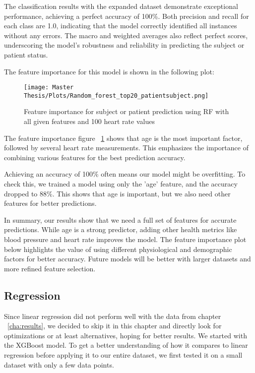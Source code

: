 The classification results with the expanded dataset demonstrate exceptional performance, achieving a perfect accuracy of 100\%. Both precision and recall for each class are 1.0, indicating that the model correctly identified all instances without any errors. The macro and weighted averages also reflect perfect scores, underscoring the model's robustness and reliability in predicting the subject or patient status.

The feature importance for this model is shown in the following plot:

\FloatBarrier
\begin{figure}[h!]
    \centering
    \texttt{[image: Master Thesis/Plots/Random\_forest\_top20\_patientsubject.png]}
    \caption{Feature importance for subject or patient prediction using RF with all given features and 100 heart rate values}
    \label{table:featureimportanceRFsubpat100}
\end{figure}
\FloatBarrier

The feature importance figure ~\ref{table:featureimportanceRFsubpat100} shows that age is the most important factor, followed by several heart rate measurements. This emphasizes the importance of combining various features for the best prediction accuracy.

Achieving an accuracy of 100\% often means our model might be overfitting. To check this, we trained a model using only the 'age' feature, and the accuracy dropped to 88\%. This shows that age is important, but we also need other features for better predictions.

In summary, our results show that we need a full set of features for accurate predictions. While age is a strong predictor, adding other health metrics like blood pressure and heart rate improves the model. The feature importance plot below highlights the value of using different physiological and demographic factors for better accuracy. Future models will be better with larger datasets and more refined feature selection.

\subsection{Regression}

Since linear regression did not perform well with the data from chapter ~\ref{cha:results}, we decided to skip it in this chapter and directly look for optimizations or at least alternatives, hoping for better results. We started with the XGBoost model. To get a better understanding of how it compares to linear regression before applying it to our entire dataset, we first tested it on a small dataset with only a few data points.

